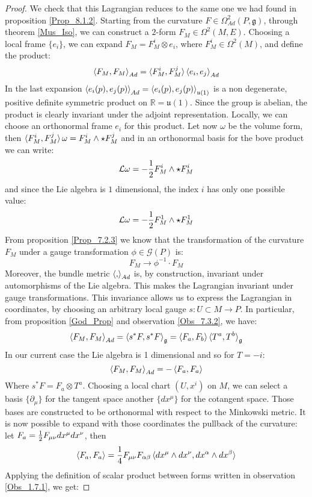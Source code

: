 \documentclass[12pt,a4paper]{report}
\theoremstyle{definition}
\theoremstyle{Theorem}
\theoremstyle{definition}
\theoremstyle{definition}
\begin{document}
	\begin{proof}
		We check that this Lagrangian reduces to the same one we had found in proposition \ref{Prop_8.1.2}. Starting from the curvature $F\in \Omega^2_{Ad}(P,\mathfrak{g})$, through theorem \ref{Mus_Iso}, we can construct a $2$-form $F_M\in \Omega^2(M,E)$. Choosing a local frame $\{e_i\}$, we can expand $F_M=F^i_{M}\otimes e_i$, where $F_M^i\in \Omega^2(M)$, and define the product: $$\braket{F_M,F_M}_{Ad}=\braket{F_M^i,F_M^j}\braket{e_i,e_j}_{Ad}$$
		In the last expansion $\braket{e_i(p),e_j(p)}_{Ad}=\braket{e_i(p),e_j(p)}_{\mathfrak{u}(1)}$ is a non degenerate, positive definite symmetric product on $\mathbb{R}=\mathfrak{u}(1)$. Since the group is abelian, the product is clearly invariant under the adjoint representation. Locally, we can choose an orthonormal frame $e_i$ for this product. Let now $\omega$ be the volume form, then $\braket{F_M^i,F_M^j}\omega=F_M^i\wedge\star F_M^j$ and in an orthonormal basis for the bove product we can write:
		$$\mathcal{L}\omega=-{1\over 2}F_M^i\wedge \star F_M^i$$
		and since the Lie algebra is $1$ dimensional, the index $i$ has only one possible value:
		$$\mathcal{L}\omega=-{1\over 2}F^1_M\wedge \star F^1_M$$
		From proposition \ref{Prop_7.2.3} we know that the transformation of the curvature $F_M$ under a gauge transformation $\phi\in \mathcal{G}(P)$ is:
		$$F_M\rightarrow \phi^{-1}\cdot F_M$$
		Moreover, the bundle metric $\braket{,}_{Ad}$ is, by construction, invariant under automorphisms of the Lie algebra. This makes the Lagrangian invariant under gauge transformations. This invariance allows us to express the Lagrangian in coordinates, by choosing an arbitrary local gauge $s:U\subset M\rightarrow P$. In particular, from proposition \ref{God_Prop} and observation \ref{Obs_7.3.2}, we have:
		$$\braket{F_M,F_M}_{Ad}=\braket{s^*F,s^*F}_\mathfrak{g}=\braket{F_a,F_b}\braket{T^a,T^b}_\mathfrak{g}$$
		In our current case the Lie algebra is 1 dimensional and so for $T=-i$:
		$$\braket{F_M,F_M}_{Ad}=-\braket{F_a,F_a}$$
		Where $s^*F=F_a\otimes T^a$.
		Choosing a local chart $(U,x^i)$ on $M$, we can select a basis $\{\partial_\mu\}$ for the tangent space another $\{dx^\mu\}$ for the cotangent space. Those bases are constructed to be orthonormal with respect to the Minkowski metric. It is now possible to expand with those coordinates the pullback of the curvature: let $F_a={1\over 2}F_{\mu\nu}dx^\mu dx^\nu$, then
		$$\braket{F_a,F_a}={1\over 4}F_{\mu\nu} F_{\alpha\beta}\braket{dx^\mu\wedge dx^\nu,dx^\alpha\wedge dx^\beta}$$ 
		Applying the definition of scalar product between forms written in observation \ref{Obs_1.7.1}, we get:

\end{proof}
\end{document}
